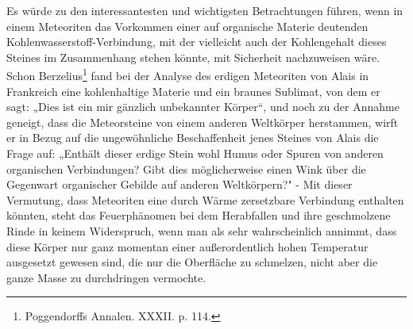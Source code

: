 \documentclass[a4paper, 11pt, oneside]{article}
\begin{document}
Es würde zu den interessantesten und wichtigsten Betrachtungen führen, wenn in einem Meteoriten das Vorkommen einer auf organische Materie deutenden Kohlenwasserstoff-Verbindung, mit der vielleicht auch der Kohlengehalt dieses Steines im Zusammenhang stehen könnte, mit Sicherheit nachzuweisen wäre. Schon Berzelius\footnote{Poggendorffs Annalen. XXXII. p. 114.} fand bei der Analyse des erdigen Meteoriten von Alais in Frankreich eine kohlenhaltige Materie und ein braunes Sublimat, von dem er sagt: „Dies ist ein mir gänzlich unbekannter Körper“, und noch zu der Annahme geneigt, dass die Meteorsteine von einem anderen Weltkörper herstammen, wirft er in Bezug auf die ungewöhnliche Beschaffenheit jenes Steines von Alais die Frage auf: „Enthält dieser erdige Stein wohl Humus oder Spuren von anderen organischen Verbindungen? Gibt dies möglicherweise einen Wink über die Gegenwart organischer Gebilde auf anderen Weltkörpern?" - Mit dieser Vermutung, dass Meteoriten eine durch Wärme zersetzbare Verbindung enthalten könnten, steht das Feuerphänomen bei dem Herabfallen und ihre geschmolzene Rinde in keinem Widerspruch, wenn man als sehr wahrscheinlich annimmt, dass diese Körper nur ganz momentan einer außerordentlich hohen Temperatur ausgesetzt gewesen sind, die nur die Oberfläche zu schmelzen, nicht aber die ganze Masse zu durchdringen vermochte.
\clearpage
\end{document}
